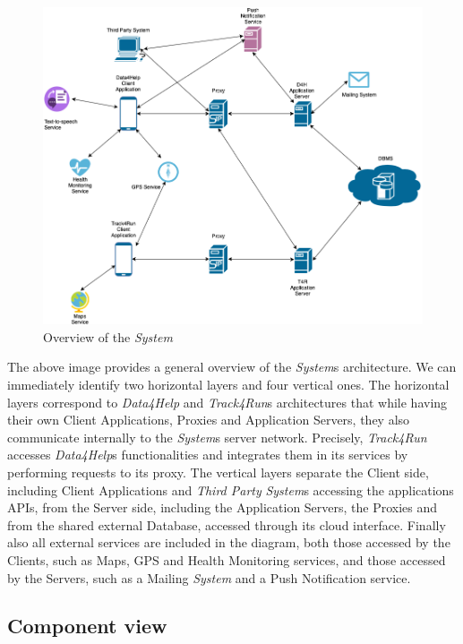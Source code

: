 \documentclass[titlepage]{article}
\begin{document}
	\begin{figure}[H]
		\center
		\includegraphics[width=\textwidth]{Overview.png}
		\caption{Overview of the {\it System}}
		\label{fig:OVERVIEW}
	\end{figure}
	\noindent
	The above image provides a general overview of the {\it System}\textsc{}s architecture. We can immediately identify two horizontal layers and four vertical ones.
	The horizontal layers correspond to {\it Data4Help} and {\it Track4Run}\textsc{}s architectures that while having their own Client Applications, Proxies and Application Servers, they also communicate internally to the {\it System}\textsc{}s server network. 
	Precisely, {\it Track4Run} accesses {\it Data4Help}\textsc{}s functionalities and integrates them in its services by performing requests to its proxy.
	The vertical layers separate the Client side, including Client Applications and {\it Third Party} {\it System}s accessing the applications\textsc{} APIs, from the Server side, including the Application Servers, the Proxies and from the shared external Database, accessed through its cloud interface.
	Finally also all external services are included in the diagram, both those accessed by the Clients, such as Maps, GPS and Health Monitoring services, and those accessed by the Servers, such as a Mailing {\it System} and a Push Notification service.
	\pagebreak
	
	\subsection{Component view}
	
\end{document}

